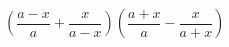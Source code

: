 \begin{ex}[type=expression]
	\begin{condition}
		\( \left( \dfrac{a-x}{a}+\dfrac{x}{a-x} \right)\left( \dfrac{a+x}{a}-\dfrac{x}{a+x} \right) \)
	\end{condition}
\end{ex}